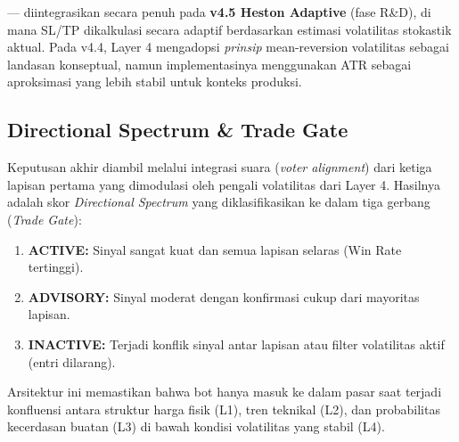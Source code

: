 --- diintegrasikan secara penuh pada \textbf{v4.5 Heston Adaptive} (fase R\&D), di mana SL/TP dikalkulasi secara adaptif berdasarkan estimasi volatilitas stokastik aktual. Pada v4.4, Layer 4 mengadopsi \textit{prinsip} mean-reversion volatilitas sebagai landasan konseptual, namun implementasinya menggunakan ATR sebagai aproksimasi yang lebih stabil untuk konteks produksi.

\subsection{Directional Spectrum \& Trade Gate}
Keputusan akhir diambil melalui integrasi suara (\textit{voter alignment}) dari ketiga lapisan pertama yang dimodulasi oleh pengali volatilitas dari Layer 4. Hasilnya adalah skor \textit{Directional Spectrum} yang diklasifikasikan ke dalam tiga gerbang (\textit{Trade Gate}):

\begin{enumerate}
    \item \textbf{ACTIVE:} Sinyal sangat kuat dan semua lapisan selaras (Win Rate tertinggi).
    \item \textbf{ADVISORY:} Sinyal moderat dengan konfirmasi cukup dari mayoritas lapisan.
    \item \textbf{INACTIVE:} Terjadi konflik sinyal antar lapisan atau filter volatilitas aktif (entri dilarang).
\end{enumerate}

Arsitektur ini memastikan bahwa bot hanya masuk ke dalam pasar saat terjadi konfluensi antara struktur harga fisik (L1), tren teknikal (L2), dan probabilitas kecerdasan buatan (L3) di bawah kondisi volatilitas yang stabil (L4).
